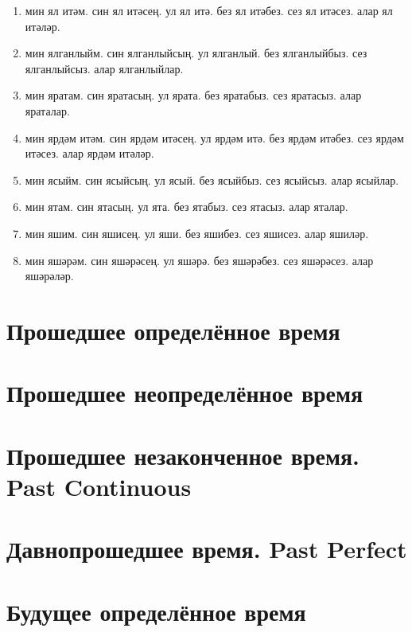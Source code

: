 \documentclass{article}
\begin{document}
\begin{enumerate}
    \item
    мин ял итәм.
    син ял итәсең.
    ул ял итә.
    без ял итәбез.
    сез ял итәсез.
    алар ял итәләр.

    \item
    мин ялганлыйм.
    син ялганлыйсың.
    ул ялганлый.
    без ялганлыйбыз.
    сез ялганлыйсыз.
    алар ялганлыйлар.

    \item
    мин яратам.
    син яратасың.
    ул ярата.
    без яратабыз.
    сез яратасыз.
    алар яраталар.

    \item
    мин ярдәм итәм.
    син ярдәм итәсең.
    ул ярдәм итә.
    без ярдәм итәбез.
    сез ярдәм итәсез.
    алар ярдәм итәләр.

    \item
    мин ясыйм.
    син ясыйсың.
    ул ясый.
    без ясыйбыз.
    сез ясыйсыз.
    алар ясыйлар.

    \item
    мин ятам.
    син ятасың.
    ул ята.
    без ятабыз.
    сез ятасыз.
    алар яталар.

    \item
    мин яшим.
    син яшисең.
    ул яши.
    без яшибез.
    сез яшисез.
    алар яшиләр.

    \item
    мин яшәрәм.
    син яшәрәсең.
    ул яшәрә.
    без яшәрәбез.
    сез яшәрәсез.
    алар яшәрәләр.

\end{enumerate}

\section{Прошедшее определённое время}
\section{Прошедшее неопределённое время}
\section{Прошедшее незаконченное время. Past Continuous}
\section{Давнопрошедшее время. Past Perfect}
\section{Будущее определённое время}
\end{document}

